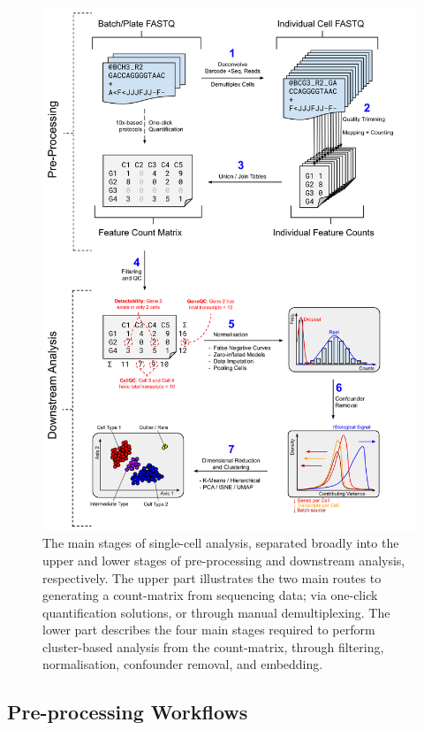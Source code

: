 \documentclass[a4paper,num-refs]{oup-contemporary}
\begin{document}
\begin{figure}[bt!]
\centering
\includegraphics[width=\linewidth]{Images/Paper_scRNA_Galaxy_Process2.png}
\caption{The main stages of single-cell analysis, separated broadly into the upper and lower stages of pre-processing and downstream analysis, respectively. The upper part illustrates the two main routes to generating a count-matrix from sequencing data; via one-click quantification solutions, or through manual demultiplexing. The lower part describes the four main stages required to perform cluster-based analysis from the count-matrix, through filtering, normalisation, confounder removal, and embedding.}\label{fig:process}
\end{figure}

\subsection{Pre-processing Workflows}
\end{document}
